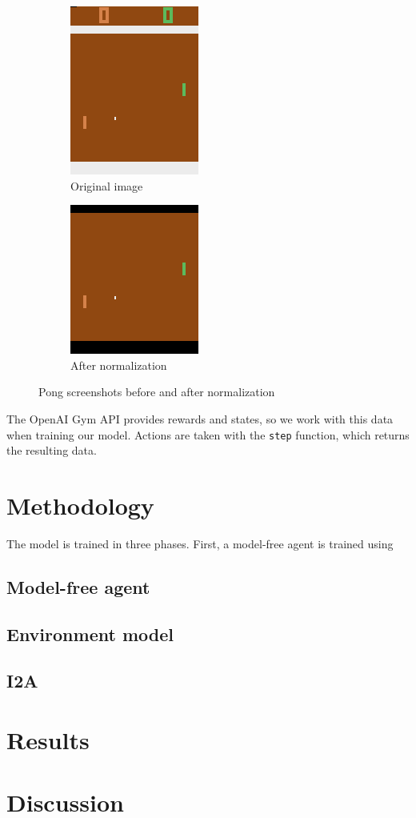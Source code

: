 \documentclass[10pt, twocolumn]{article}
\begin{document}
\begin{figure}[h]
\centering
\begin{subfigure}[b]{.2\textwidth}
  \centering
  \includegraphics[scale=0.5]{unnormalized}
  \caption{Original image}
  \label{fig:unnormalized}
\end{subfigure} 
\begin{subfigure}[b]{.2\textwidth}
  \centering
  \includegraphics[scale=0.5]{normalized}
  \caption{After normalization}
  \label{fig:normalized}
\end{subfigure} \hfill
\caption{Pong screenshots before and after normalization}
\label{screenshots}
\end{figure}

The OpenAI Gym API provides rewards and states, so we work with this data when training our model.
Actions are taken with the \verb|step| function, which returns the resulting data.

\section{Methodology}

The model is trained in three phases. First, a model-free agent is trained using 

\subsection{Model-free agent}

\subsection{Environment model}

\subsection{I2A}

\section{Results}

\section{Discussion}
\end{document}

